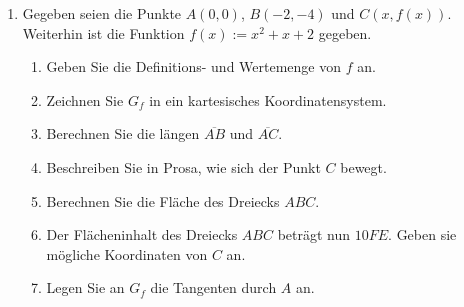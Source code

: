 \documentclass{scrartcl}
\begin{document}
		
	\begin{enumerate}
		\item Gegeben seien die Punkte $A(0,0)$, $B(-2,-4)$ und $C(x,f(x))$. \\Weiterhin ist die Funktion $f(x):=x^2 +x +2$ gegeben.
			\begin{enumerate}
				\item Geben Sie die Definitions- und Wertemenge von $f$ an.
				\item Zeichnen Sie $G_f$ in ein kartesisches Koordinatensystem.
				\item Berechnen Sie die längen $\overline{AB}$ und $\overline{AC}$.
				\item Beschreiben Sie in Prosa, wie sich der Punkt $C$ bewegt.
				\item Berechnen Sie die Fläche des Dreiecks $ABC$.
				\item Der Flächeninhalt des Dreiecks $ABC$ beträgt nun $10FE$. Geben sie mögliche Koordinaten von $C$ an.
				\item Legen Sie an $G_f$ die Tangenten durch $A$ an.
			\end{enumerate}
				
	\end{enumerate} 
	
	

	
\end{document}
